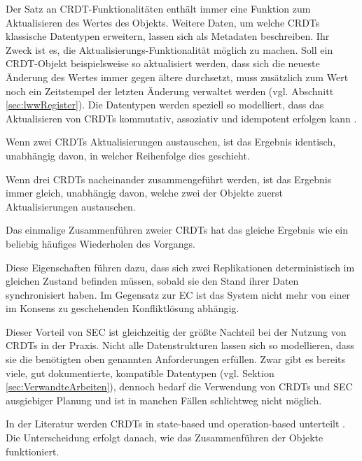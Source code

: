 \documentclass[a4paper, 12pt]{scrreprt}
\begin{document}
Der Satz an CRDT-Funktionalitäten enthält immer eine Funktion zum Aktualisieren des Wertes des Objekts. Weitere Daten, um welche \acp{CRDT} klassische Datentypen erweitern, lassen sich als Metadaten beschreiben. Ihr Zweck ist es, die Aktualisierungs-Funktionalität möglich zu machen. Soll ein CRDT-Objekt beispielsweise so aktualisiert werden, dass sich die neueste Änderung des Wertes immer gegen ältere durchsetzt, muss zusätzlich zum Wert noch ein Zeitstempel der letzten Änderung verwaltet werden (vgl. Abschnitt \ref{sec:lwwRegister}).
Die Datentypen werden speziell so modelliert, dass das Aktualisieren von \acp{CRDT} kommutativ, assoziativ und idempotent erfolgen kann \autocite{InproceedingsCrdtsInProduction}.

\begin{description}
	\label{sec:kommuassoidem}
	\item[Kommutativ] Wenn zwei \acp{CRDT} Aktualisierungen austauschen, ist das Ergebnis identisch, unabhängig davon, in welcher Reihenfolge dies geschieht.%
	\item[Assoziativ] Wenn drei \acp{CRDT} nacheinander zusammengeführt werden, ist das Ergebnis immer gleich, unabhängig davon, welche zwei der Objekte zuerst Aktualisierungen austauschen.%
	\item[Idempotent] Das einmalige Zusammenführen zweier \acp{CRDT} hat das gleiche Ergebnis wie ein beliebig häufiges Wiederholen des Vorgangs.%
\end{description}

Diese Eigenschaften führen dazu, dass sich zwei Replikationen deterministisch im gleichen Zustand befinden müssen, sobald sie den Stand ihrer Daten synchronisiert haben. Im Gegensatz zur \ac{EC} ist das System nicht mehr von einer im Konsens zu geschehenden Konfliktlösung abhängig. 

Dieser Vorteil von \ac{SEC} ist gleichzeitig der größte Nachteil bei der Nutzung von \acp{CRDT} in der Praxis. Nicht alle Datenstrukturen lassen sich so modellieren, dass sie die benötigten oben genannten Anforderungen erfüllen. Zwar gibt es bereits viele, gut dokumentierte, kompatible Datentypen (vgl. Sektion \ref{sec:VerwandteArbeiten}), dennoch bedarf die Verwendung von \acp{CRDT} und \ac{SEC} ausgiebiger Planung und ist in manchen Fällen schlichtweg nicht möglich.

In der Literatur werden \acp{CRDT} in state-based und operation-based unterteilt \autocite[S. 10]{ArticleOptimisticReplication}. Die Unterscheidung erfolgt danach, wie das Zusammenführen der Objekte funktioniert.
\end{document}
